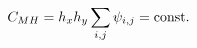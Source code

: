 \documentclass[preview]{standalone}
\begin{document}
\begin{align*}
\special{dvisvgm:raw <g id='unique000'>}C_{MH}=h_xh_y\sum_{i,j}\psi_{i,j} = \text{const.}\special{dvisvgm:raw </g>}
\end{align*}
\end{document}

